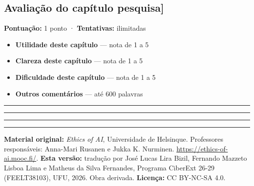 \documentclass[
  11pt,
]{article}
\providecommand{\tightlist}{%
  \setlength{\itemsep}{0pt}\setlength{\parskip}{0pt}}
\newcommand{\faixaEixos}[1][\linewidth]{%
  \noindent
  \textcolor{iaConceitos}{\rule{0.3333#1}{4pt}}%
  \textcolor{iaAplic}{\rule{0.3333#1}{4pt}}%
  \textcolor{iaRiscos}{\rule{0.3333#1}{4pt}}%
  \par}
\renewcommand{\texttt}[1]{{\color{iaAmeixa}\small\ttfamily #1}}
\newenvironment{licenca}
  {\par\vspace{2em}\faixaEixos\par\vspace{0.8em}
   \begingroup\sffamily\scriptsize\color{iaTintaFraca}}
  {\endgroup\par}
\begin{document}
\hypertarget{avaliauxe7uxe3o-do-capuxedtulo-pesquisa}{%
\subsection{\texorpdfstring{Avaliação do capítulo
\texttt{{[}pesquisa{]}}}{Avaliação do capítulo {[}pesquisa{]}}}\label{avaliauxe7uxe3o-do-capuxedtulo-pesquisa}}

\textbf{Pontuação:} 1 ponto · \textbf{Tentativas:} ilimitadas

\begin{itemize}
\tightlist
\item
  \textbf{Utilidade deste capítulo} --- nota de 1 a 5
\item
  \textbf{Clareza deste capítulo} --- nota de 1 a 5
\item
  \textbf{Dificuldade deste capítulo} --- nota de 1 a 5
\item
  \textbf{Outros comentários} --- até 600 palavras
\end{itemize}

\begin{center}\rule{0.5\linewidth}{0.5pt}\end{center}

\begin{licenca}

\textbf{Material original:} \emph{Ethics of AI}, Universidade de
Helsinque. Professores responsáveis: Anna-Mari Rusanen e Jukka K.
Nurminen. \url{https://ethics-of-ai.mooc.fi/}. \textbf{Esta versão:}
tradução por José Lucas Lira Bizil, Fernando Mazzeto Lisboa Lima e
Matheus da Silva Fernandes, Programa CiberExt 26-29 (FEELT38103), UFU,
2026. Obra derivada. \textbf{Licença:} CC BY-NC-SA 4.0.

\end{licenca}
\end{document}
